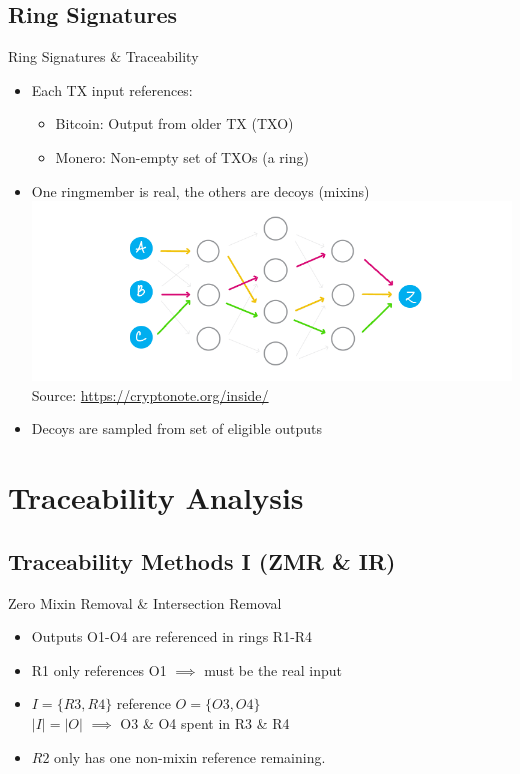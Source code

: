 \subsection{Ring Signatures}
\begin{frame}{Ring Signatures \& Traceability}
	\vspace*{-10pt}
	\begin{itemize}[<+->]
		\item Each TX input references:
		\begin{itemize}
			\item Bitcoin: Output from older TX (TXO)
			\item Monero: Non-empty set of TXOs (a ring)
		\end{itemize}
		\item One ringmember is real, the others are decoys (mixins)
		\includegraphics[width=\textwidth]{./img/slides/cn-44.png}
{		\hspace*{90pt}\scriptsize Source: \url{https://cryptonote.org/inside/}}
		\item Decoys are sampled from set of eligible outputs
	\end{itemize}
\end{frame}
\section{Traceability Analysis}


\subsection{Traceability Methods I (ZMR \& IR)}
\begin{frame}{Zero Mixin Removal \& Intersection Removal}
	\resizebox{\textwidth}{!}{}
	\begin{itemize}
		\item Outputs O1-O4 are referenced in rings R1-R4
		\item<2-> R1 only references O1 $\implies$ must be the real input
		\item<3-> $I = \{R3,R4\}$ reference $O=\{O3,O4\}$  \\
		\qquad	$|I| = |O|$ $\implies$ O3 \& O4 spent in R3 \& R4
		\item<4-> $R2$ only has one non-mixin reference remaining.
	\end{itemize}
\end{frame}

